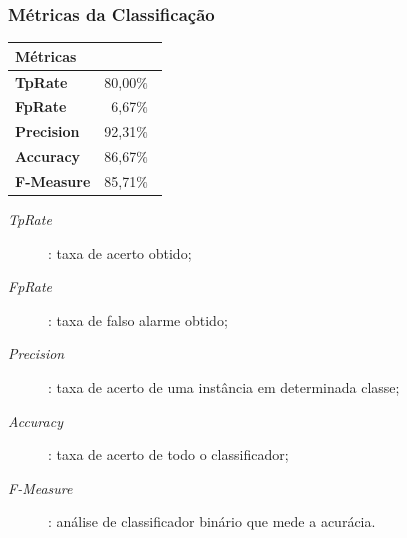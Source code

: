 \documentclass{beamer}
\begin{document}
\begin{frame}
   \frametitle{Métricas da Classificação}
   \begin{block}{}
   		\begin{table}[!htbp]
				\label{table:metricasmatrizconfusao}
				\centering
				\begin{tabular}{|l|r|}
				\hline
				\multicolumn{2}{|l|}{\textbf{Métricas}} \\ \hline
				\textbf{TpRate}                    & 80,00$\%$\               \\ \hline
				\textbf{FpRate}                    & 6,67$\%$\                \\ \hline
				\textbf{Precision}                 & 92,31$\%$\                \\ \hline
				\textbf{Accuracy}                  & 86,67$\%$\                \\ \hline
				\textbf{F-Measure}                 & 85,71$\%$\                \\ \hline
				\end{tabular}
				\end{table}
	\end{block}
     \begin{block}{}
				\begin{description}
				\item [\textit{TpRate}]: taxa de acerto obtido;
				\item [\textit{FpRate}]: taxa de falso alarme obtido;
				\item [\textit{Precision}]: taxa de acerto de uma instância em determinada classe;
				\item [\textit{Accuracy}]: taxa de acerto de todo o classificador;
				\item [\textit{F-Measure}]: análise de classificador binário que mede a acurácia.
				\end{description}
    \end{block}
\end{frame}
\end{document}
